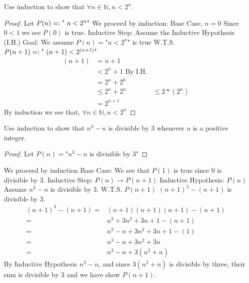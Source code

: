 \begin{exmp}
Use induction to show that $\forall n\in \mathbb{N}, n< 2^n$.
\begin{proof}
Let $P(n)=:\text{" $ n< 2^n$"}$
\newline
We proceed by induction:
\newline
Base Case, $n=0$
\newline
Since $0<1$ we see $P(0)$ is true. 
\newline
Inductive Step:
\newline
Assume the Inductive Hypothesis (I.H.)
\newline
Goal:
\newline
We assume $P(n)=\text{"$n<2^n$"}$ is true
\newline
W.T.S. $P(n+1)=:\text{" $ (n+1)< 2^{(n+1)}$"}$
\newline
\begin{align}
(n+1)&=n+1\\
    &<2^n+1 \text{ By I.H.}\\
    &=2^n+2^0\\
    &\leq 2^n+2^n
    &\leq 2*(2^n)\\
    &=2^{n+1}
\end{align}
By induction we see that,
$\forall n \in \mathbb{N}, n<2^n$

\end{proof}

\end{exmp}
\begin{exmp}
Use induction to show that $n^3-n$ is divisible by 3 whenever $n$ is a positive integer. 
\begin{proof}
Let $P(n)=\text{"$n^3-n$ is divisible by 3"}$
\newline

\end{proof}
We proceed by induction
\newline
Base Case:
\newline
We see that $P(1)$ is true since 0 is divisible by 3.
\newline
Inductive Step: $P(n)\to P(n+1)$
\newline
Inductive Hypothesis: $P(n)$
\newline
Assume $n^3-n$ is divisible by 3.
\newline
W.T.S. $P(n+1)$
\newline
$(n+1)^3-(n+1)$ is divisible by 3.
\newline
\begin{align}
(n+1)^3-(n+1)=&(n+1)(n+1)(n+1)-(n+1)\\
=&n^3+3n^2+3n+1-(n+1)\\
=&n^3-n +3n^2+3n+1-(1)\\
=&n^3-n +3n^2+3n\\
=&n^3-n +3(n^2+n)
\end{align}
By Inductive Hypothesis $n^3-n$, and since $3(n^2+n)$ is divisible by three, their sum is divisible by 3 and we have show $P(n+1)$.
\end{exmp}
\newpage
